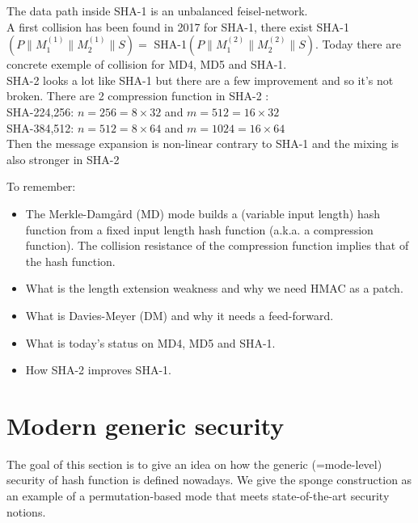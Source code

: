 \documentclass[11pt,a4paper]{report}
\begin{document}
The data path inside SHA-1 is an unbalanced feisel-network.\\ 
A first collision has been found in 2017 for SHA-1, there exist SHA-1$(P \parallel M_1^{(1)} \parallel M_2^{(1)} \parallel S)=$ SHA-1$(P \parallel M_1^{(2)} \parallel M_2^{(2)} \parallel S)$.
Today there are concrete exemple of collision for MD4, MD5 and SHA-1.\\

SHA-2 looks a lot like SHA-1 but there are a few improvement and so it's not broken. There are 2 compression function in SHA-2 : \\
SHA-{224,256}: $n = 256 = 8 \times 32$ and $m = 512 = 16 \times 32$\\
SHA-{384,512}: $n = 512 = 8 \times 64$ and $m = 1024 = 16 \times 64$\\
Then the message expansion is non-linear contrary to SHA-1 and the mixing is also stronger in SHA-2

To remember:
\begin{itemize}
\item The Merkle-Damgård (MD) mode builds a (variable input length) hash function from a fixed input length hash function (a.k.a. a compression function). The collision resistance of the compression function implies that of the hash function.
\item What is the length extension weakness and why we need HMAC as a patch.
\item What is Davies-Meyer (DM) and why it needs a feed-forward.
\item What is today's status on MD4, MD5 and SHA-1.
\item How SHA-2 improves SHA-1.
\end{itemize}

\section{Modern generic security}
The goal of this section is to give an idea on how the generic (=mode-level) security of hash function is defined nowadays. We give the sponge construction as an example of a permutation-based mode that meets state-of-the-art security notions.\\
\end{document}
